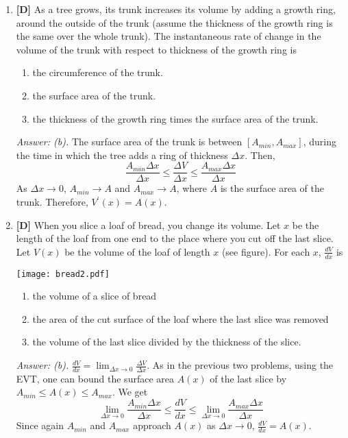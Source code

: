\documentclass[12pt]{article}
\begin{document}
\begin{enumerate}
\bigskip

\item {\bf [D]} As a tree grows, its trunk increases its volume by adding a
growth ring, around the outside of the trunk (assume the thickness of the growth ring is the same over the whole trunk).  The
instantaneous rate of change in the volume of the trunk with
respect to thickness of the growth ring is
\begin{enumerate}
\item the circumference of the trunk.
\item the surface area of the
trunk. 
\item the thickness of the growth ring times the surface
area of the trunk.
\end{enumerate}

{\it Answer: (b).} The surface area of the trunk is between $[A_{min}, A_{max}]$, during the time in which the tree adds a ring of thickness $\Delta x$. Then, 
$$\frac{A_{min} \Delta x}{\Delta x}\le \frac{\Delta V}{\Delta x}\le \frac{A_{max} \Delta x}{\Delta x}$$
As $\Delta x \to 0$, $A_{min} \to A$ and $A_{max} \to A$, where $A$ is the surface area of the trunk. 
Therefore, $V^{\prime}(x)=A(x)$.

\bigskip

\item {\bf [D]} When you slice a loaf of bread, you change its volume. Let $x$ be the length of the loaf from one end to the place where you cut off the last slice. Let $V(x)$ be the volume of the loaf of length $x$ (see figure). For each $x$, $\frac{dV}{
dx}$ is

\begin{center}
%
\texttt{[image: bread2.pdf]}
\end{center}

\begin{enumerate}
\item the volume of a slice of bread
\item the area of the cut surface of the loaf where the last slice was removed
\item the volume of the last slice divided by the thickness of the slice.
\end{enumerate}

{\it Answer: (b).} $\displaystyle{\frac{dV}{dx}=\lim_{\Delta x \to 0} \frac{\Delta V}{\Delta x}}$. 
As in the previous two problems, using the EVT, one can bound the surface area $A(x)$ of the last slice by 
$A_{min}\le A(x) \le A_{max}$. We get
$$\lim_{\Delta x\to 0} \frac {A_{min}\Delta x}{\Delta x} \le  \frac{dV}{dx} \le \lim_{\Delta x\to 0} \frac{A_{max}\Delta x}{\Delta x}$$
Since again $A_{min}$ and $A_{max}$ approach $A(x)$ as $\Delta x \to 0$, $\frac{dV}{dx}=A(x)$.

\end{enumerate}
\end{document}
